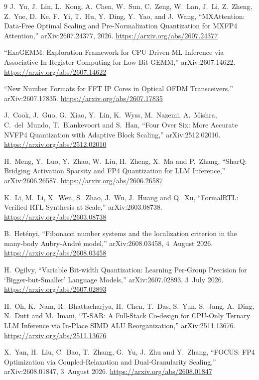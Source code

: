 \documentclass[11pt]{article}
\theoremstyle{definition}
\begin{document}
\begin{thebibliography}{9}
 J.~Yu, J.~Lin, L.~Kong, A.~Chen, W.~Sun, C.~Zeng,
W.~Lan, J.~Li, Z.~Zheng, Z.~Yue, D.~Ke, F.~Yi, T.~Hu, Y.~Ding, Y.~Yao, and
J.~Wang, ``MXAttention: Data-Free Optimal Scaling and Pre-Normalization
Quantization for MXFP4 Attention,'' arXiv:2607.24377, 2026.
\url{https://arxiv.org/abs/2607.24377}

 ``ExaGEMM: Exploration Framework for CPU-Driven ML Inference via Associative In-Register Computing for Low-Bit GEMM,'' arXiv:2607.14622. \url{https://arxiv.org/abs/2607.14622}

 ``New Number Formats for FFT IP Cores in Optical OFDM Transceivers,'' arXiv:2607.17835. \url{https://arxiv.org/abs/2607.17835}

 J.~Cook, J.~Guo, G.~Xiao, Y.~Lin, K.~Wyss, M.~Nazemi, A.~Mishra, C.~del~Mundo, T.~Blankevoort and S.~Han, ``Four Over Six: More Accurate NVFP4 Quantization with Adaptive Block Scaling,'' arXiv:2512.02010. \url{https://arxiv.org/abs/2512.02010}

 H.~Meng, Y.~Luo, Y.~Zhao, W.~Liu, H.~Zheng, X.~Ma and P.~Zhang, ``SharQ: Bridging Activation Sparsity and FP4 Quantization for LLM Inference,'' arXiv:2606.26587. \url{https://arxiv.org/abs/2606.26587}

 K.~Li, M.~Li, X.~Wen, S.~Zhao, J.~Wu, J.~Huang and Q.~Xu, ``FormalRTL: Verified RTL Synthesis at Scale,'' arXiv:2603.08738. \url{https://arxiv.org/abs/2603.08738}

 B.~Het\'enyi, ``Fibonacci number systems and the localization criterion in the many-body Aubry-Andr\'e model,'' arXiv:2608.03458, 4~August 2026. \url{https://arxiv.org/abs/2608.03458}

 H.~Ogilvy, ``Variable Bit-width Quantization: Learning Per-Group Precision for `Bigger-but-Smaller' Language Models,'' arXiv:2607.02893, 3~July 2026. \url{https://arxiv.org/abs/2607.02893}

 H.~Oh, K.~Nam, R.~Bhattacharjya, H.~Chen, T.~Das, S.~Yun, S.~Jang, A.~Ding, N.~Dutt and M.~Imani, ``T-SAR: A Full-Stack Co-design for CPU-Only Ternary LLM Inference via In-Place SIMD ALU Reorganization,'' arXiv:2511.13676. \url{https://arxiv.org/abs/2511.13676}

 X.~Yan, H.~Liu, C.~Bao, T.~Zhang, G.~Yu, J.~Zhu and Y.~Zhang, ``FOCUS: FP4 Optimization via Coupled-Relaxation and Dual-Granularity Scaling,'' arXiv:2608.01847, 3~August 2026. \url{https://arxiv.org/abs/2608.01847}


\end{thebibliography}
\end{document}
